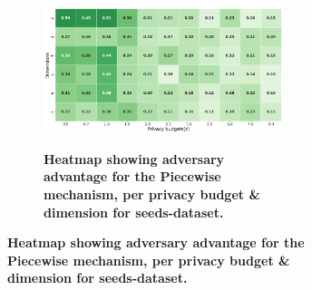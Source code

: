 \begin{figure}[H]
\begin{subfigure}[b]{0.9\textwidth}
    \begin{subfigure}[c]{1\textwidth}
      \caption{\textbf{Heatmap showing adversary advantage for the Piecewise mechanism, per privacy budget \& dimension for seeds-dataset.}}
      \includegraphics[width=1\textwidth]{Results/kd-laplace/piecewise/seeds-dataset/shokri_mi_adv.png}
      \label{fig:privacy_seeds-dataset_adversial_advantage_piecewise}
    \end{subfigure}
  \end{subfigure}
  \hfill %
  \begin{subfigure}[b]{0.075\textwidth}

\end{subfigure}
\end{figure}
